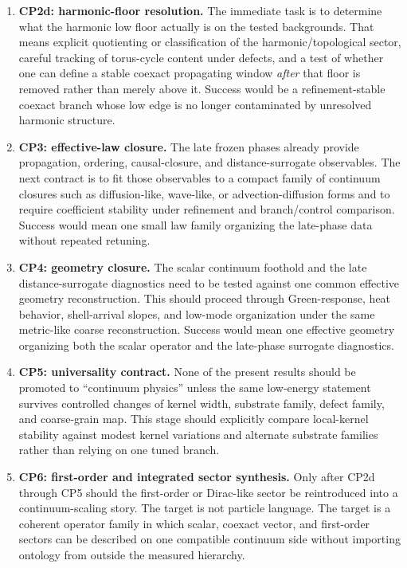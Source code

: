 \documentclass[11pt]{article}
\begin{document}
\begin{enumerate}
\item \textbf{CP2d: harmonic-floor resolution.} The immediate task is to determine what the harmonic low floor actually is on the tested backgrounds. That means explicit quotienting or classification of the harmonic/topological sector, careful tracking of torus-cycle content under defects, and a test of whether one can define a stable coexact propagating window \emph{after} that floor is removed rather than merely above it. Success would be a refinement-stable coexact branch whose low edge is no longer contaminated by unresolved harmonic structure.

\item \textbf{CP3: effective-law closure.} The late frozen phases already provide propagation, ordering, causal-closure, and distance-surrogate observables. The next contract is to fit those observables to a compact family of continuum closures such as diffusion-like, wave-like, or advection-diffusion forms and to require coefficient stability under refinement and branch/control comparison. Success would mean one small law family organizing the late-phase data without repeated retuning.

\item \textbf{CP4: geometry closure.} The scalar continuum foothold and the late distance-surrogate diagnostics need to be tested against one common effective geometry reconstruction. This should proceed through Green-response, heat behavior, shell-arrival slopes, and low-mode organization under the same metric-like coarse reconstruction. Success would mean one effective geometry organizing both the scalar operator and the late-phase surrogate diagnostics.

\item \textbf{CP5: universality contract.} None of the present results should be promoted to ``continuum physics'' unless the same low-energy statement survives controlled changes of kernel width, substrate family, defect family, and coarse-grain map. This stage should explicitly compare local-kernel stability against modest kernel variations and alternate substrate families rather than relying on one tuned branch.

\item \textbf{CP6: first-order and integrated sector synthesis.} Only after CP2d through CP5 should the first-order or Dirac-like sector be reintroduced into a continuum-scaling story. The target is not particle language. The target is a coherent operator family in which scalar, coexact vector, and first-order sectors can be described on one compatible continuum side without importing ontology from outside the measured hierarchy.
\end{enumerate}
\end{document}
